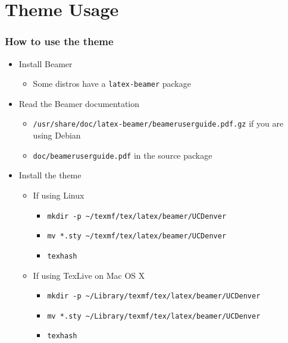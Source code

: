 \section{Theme Usage}
\begin{frame}[t,fragile]
    \frametitle{How to use the theme}
    \begin{itemize}
        \item Install Beamer
            \begin{itemize}
                \item Some distros have a \verb!latex-beamer! package
            \end{itemize}
        \item Read the Beamer documentation
            \begin{itemize}
                \item \verb!/usr/share/doc/latex-beamer/beameruserguide.pdf.gz! if you are
                    using Debian
                \item \verb!doc/beameruserguide.pdf! in the source package
            \end{itemize}
        \item Install the theme
            \begin{itemize}
                \item If using Linux
                    \begin{itemize}
                        \item \verb!mkdir -p ~/texmf/tex/latex/beamer/UCDenver!\\
                        \item \verb!mv *.sty ~/texmf/tex/latex/beamer/UCDenver!
                        \item \verb!texhash!
                    \end{itemize}
                \item If using TexLive on Mac OS X
                    \begin{itemize}
                        \item \verb!mkdir -p ~/Library/texmf/tex/latex/beamer/UCDenver!\\
                        \item \verb!mv *.sty ~/Library/texmf/tex/latex/beamer/UCDenver!
                        \item \verb!texhash!
                    \end{itemize}
            \end{itemize}
    \end{itemize}
\end{frame}

